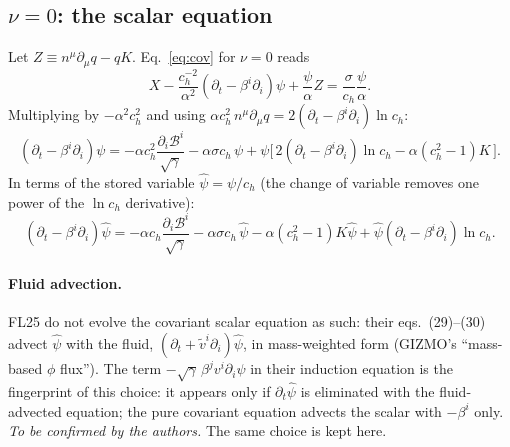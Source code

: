 \documentclass[11pt,a4paper]{article}
\newcommand{\cB}{\mathcal{B}}
\newcommand{\ph}{\hat\psi}
\newcommand{\ch}{c_h}
\newcommand{\pd}{\partial}
\newcommand{\sg}{\sqrt{\gamma}}
\begin{document}
\subsection{$\nu=0$: the scalar equation}\label{sec:psi}
Let $Z\equiv n^\mu\pd_\mu q-qK$. Eq.~\eqref{eq:cov} for $\nu=0$ reads
\begin{equation}
X-\frac{\ch^{-2}}{\alpha^2}\left(\pd_t-\beta^i\pd_i\right)\psi+\frac{\psi}{\alpha}Z=\frac{\sigma}{\ch}\frac{\psi}{\alpha}.
\end{equation}
Multiplying by $-\alpha^2\ch^2$ and using $\alpha\ch^2\,n^\mu\pd_\mu q=2(\pd_t-\beta^i\pd_i)\ln\ch$:
\begin{equation}
\left(\pd_t-\beta^i\pd_i\right)\psi=-\alpha\ch^2\frac{\pd_i\cB^i}{\sg}-\alpha\sigma\ch\,\psi
+\psi\Big[\,2\left(\pd_t-\beta^i\pd_i\right)\ln\ch-\alpha\left(\ch^2-1\right)K\,\Big].
\label{eq:psi_cov}
\end{equation}
In terms of the stored variable $\ph=\psi/\ch$ (the change of variable removes one power of the $\ln\ch$ derivative):
\begin{equation}
\left(\pd_t-\beta^i\pd_i\right)\ph=-\alpha\ch\frac{\pd_i\cB^i}{\sg}-\alpha\sigma\ch\,\ph
-\alpha\left(\ch^2-1\right)K\ph+\ph\left(\pd_t-\beta^i\pd_i\right)\ln\ch .
\label{eq:psihat_cov}
\end{equation}

\paragraph{Fluid advection.} FL25 do not evolve the covariant scalar equation as such: their eqs.~(29)--(30) advect $\ph$ with the fluid, $(\pd_t+\tilde v^i\pd_i)\ph$, in mass-weighted form (GIZMO's ``mass-based $\phi$ flux''). The term $-\sg\,\beta^jv^i\pd_i\ph$ in their induction equation is the fingerprint of this choice: it appears only if $\pd_t\ph$ is eliminated with the fluid-advected equation; the pure covariant equation advects the scalar with $-\beta^i$ only. \emph{To be confirmed by the authors.} The same choice is kept here.
\end{document}
